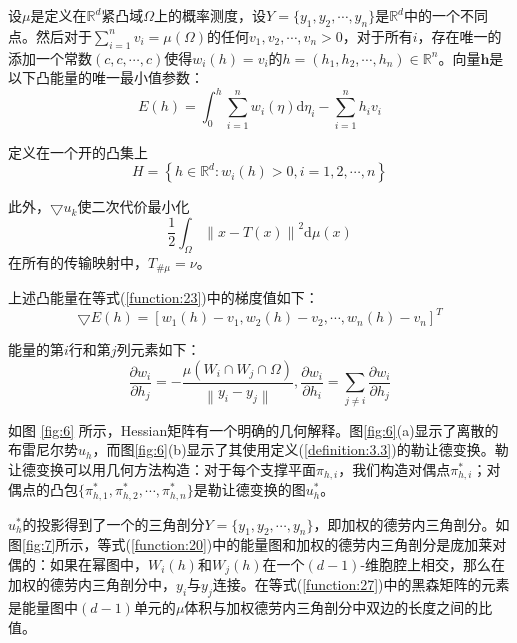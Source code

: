 \begin{theorem}[参考文献【6】]\label{theorem:4.2}
	设$\mu$是定义在$\mathbb{R}^d$紧凸域$\Omega$上的概率测度，设$Y=\{ y_1,y_2,\cdots, y_n \}$是$\mathbb{R}^d$中的一个不同点。然后对于$\sum_{i=1}^n v_i=\mu(\Omega)$的任何$v_1,v_2,\cdots, v_n>0$，对于所有$i$，存在唯一的添加一个常数$(c,c,\cdots,c)$使得$w_i(h)=v_i$的$h=(h_1,h_2,\cdots, h_n)\in \mathbb{R}^n$。向量$\mathbf{h}$是以下凸能量的唯一最小值参数：
	\begin{equation}
		E(h) =\int_0^h \sum_{i=1}^n w_i(\eta)\mathrm{d}\eta_i  - \sum_{i=1}^n h_iv_i
		\label{function:23}
	\end{equation}

	定义在一个开的凸集上
	\begin{equation}
		H=\left \{ h\in \mathbb{R}^d : w_i(h)>0,i=1,2,\cdots ,n  \right \} 
		\label{function:24}
	\end{equation}

	此外，$\bigtriangledown u_k$使二次代价最小化
	\begin{equation}
		\frac{1}{2} \int_{\Omega} \left \| x-T(x) \right \|^2 \mathrm{d}\mu(x)
		\label{function:25}
	\end{equation}
	在所有的传输映射中，$T_{\# \mu} = \nu$。
	
	上述凸能量在等式(\ref{function:23})中的梯度值如下：
	\begin{equation}
		\bigtriangledown E(h)=\left [ w_1(h)-v_1, w_2(h)-v_2, \cdots , w_n(h)-v_n \right ]^T
		\label{function:26}
	\end{equation}

	能量的第$i$行和第$j$列元素如下：
	\begin{equation}
		\frac{\partial w_i}{\partial h_j} =-\frac{\mu (W_i \cap W_j \cap \Omega)}{\left \| y_i-y_j \right \| }, \frac{\partial w_i}{\partial h_i} = \sum_{j\ne i}\frac{\partial w_i}{\partial h_j} 
		\label{function:27}
	\end{equation}

	如图 \ref{fig:6} 所示，Hessian矩阵有一个明确的几何解释。图\ref{fig:6}(a)显示了离散的布雷尼尔势$u_h$，而图\ref{fig:6}(b)显示了其使用定义(\ref{definition:3.3})的勒让德变换。勒让德变换可以用几何方法构造：对于每个支撑平面$\pi_{h,i}$，我们构造对偶点$\pi_{h,i}^*$；对偶点的凸包$\{\pi_{h,1}^* ,\pi_{h,2}^* , \cdots , \pi_{h,n}^* \}$是勒让德变换的图$u_h^*$。
	
	$u_h^*$的投影得到了一个的三角剖分$Y=\{ y_1,y_2, \cdots ,y_n \}$，即加权的德劳内三角剖分。如图\ref{fig:7}所示，等式(\ref{function:20})中的能量图和加权的德劳内三角剖分是庞加莱对偶的：如果在幂图中，$W_i(h)$和$W_j(h)$在一个$(d-1)$-维胞腔上相交，那么在加权的德劳内三角剖分中，$y_i$与$y_j$连接。在等式(\ref{function:27})中的黑森矩阵的元素是能量图中$(d-1)$单元的$\mu$体积与加权德劳内三角剖分中双边的长度之间的比值。
\end{theorem}

